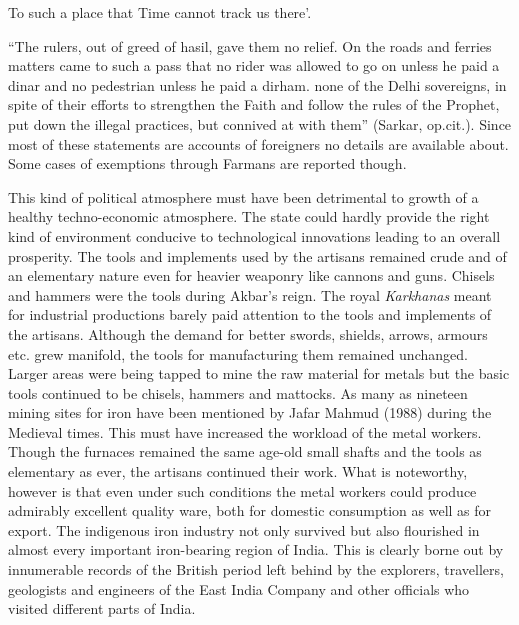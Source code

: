 To such a place that Time cannot track us there’.

“The rulers, out of greed of hasil, gave them no relief. On the roads and ferries matters came to such a pass that no rider was allowed to go on unless he paid a dinar and no pedestrian unless he paid a dirham. none of the Delhi sovereigns, in spite of their efforts to strengthen the Faith and follow the rules of the Prophet, put down the illegal practices, but connived at with them” (Sarkar, op.cit.).  Since most of these statements are accounts of foreigners no details are available about. Some cases of exemptions through Farmans are reported though. 

This kind of political atmosphere must have been detrimental to growth of a healthy techno-economic atmosphere. The state could hardly provide the right kind of environment conducive to technological innovations leading to an overall prosperity.  The tools and implements used by the artisans remained crude and of an elementary nature even for heavier weaponry like cannons and guns. Chisels and hammers were the tools during Akbar’s reign.  The royal {\it Karkhanas} meant for industrial productions barely paid attention to the tools and implements of the artisans.  Although the demand for better swords, shields, arrows, armours etc. grew manifold, the tools for manufacturing them remained unchanged.  Larger areas were being tapped to mine the raw material for metals but the basic tools continued to be chisels, hammers and mattocks.  As many as nineteen mining sites for iron have been mentioned by Jafar Mahmud (1988) during the Medieval times.  This must have increased the workload of the metal workers.  Though the furnaces remained the same age-old small shafts and the tools as elementary as ever, the artisans continued their work. What is noteworthy, however is that even under such conditions the metal workers could produce admirably excellent quality ware, both for domestic consumption as well as for export. The indigenous iron industry not only survived but also flourished in almost every important iron-bearing region of India. This is clearly borne out by innumerable records of the British period left behind by the explorers, travellers, geologists and engineers of the East India Company and other officials who visited different parts of India.


\theendnotes

\label{endchapter5}
